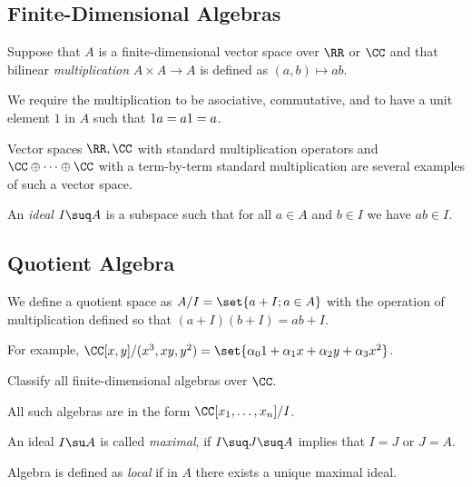 \documentclass[11pt]{scrartcl}
\begin{document}
  \subsection{Finite-Dimensional Algebras}

  Suppose that $A$ is a finite-dimensional vector space over $\RR$ or
  $\CC$ and that bilinear \textit{multiplication} $A \times A \to A$
  is defined as $(a, b)\mapsto ab$.

  We require the multiplication to be asociative, commutative, and to
  have a unit element $1$ in $A$ such that $1\*a = a\* 1 = a$.

  Vector spaces $\RR, \CC$ with standard multiplication operators and
  $\CC\oplus \dots \oplus \CC$ with a term-by-term standard
  multiplication are several examples of such a vector space.

  \begin{definition}
    An \textit{ideal} $I\suq A$ is a subspace such that for all
    $a\in A$ and $b\in I$ we have $ab \in I$.
  \end{definition}

  \subsection{Quotient Algebra}

  We define a quotient space as $A/ I = \set{a+I; a\in A}$
  with the operation of multiplication defined so that
  $(a+I)(b+I) = ab+I$.

  For example,
  $\CC[x, y]/ (x^{3}, xy, y^{2}) =
  \set{\alpha_{0}1+\alpha_{1}x+\alpha_{2}y + \alpha_{3}x^{2}}$.

  \begin{problem*}
    \hfill

    Classify all finite-dimensional algebras over $\CC$.
  \end{problem*}

  \begin{exercise}

    All such algebras are in the form $\CC[x_{1}, \dots, x_{n}]/ I$.

  \end{exercise}

  \begin{definition}
    An ideal $I \su A$ is called \textit{maximal}, if $I\suq J \suq A$ implies
    that $I = J$ or $J = A$.
  \end{definition}

  \begin{definition}
    Algebra is defined as \textit{local} if in $A$ there exists a
    unique maximal ideal.
  \end{definition}
\end{document}

